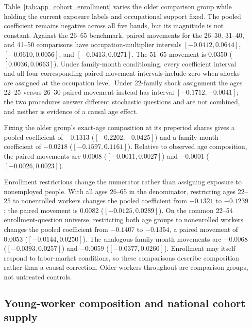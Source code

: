 Table~\ref{tab:app_cohort_enrollment} varies the older comparison group while
holding the current exposure labels and occupational support fixed.  The pooled
coefficient remains negative across all five bands, but its magnitude is not
constant.  Against the 26--65 benchmark, paired movements for the 26--30,
31--40, and 41--50 comparisons have occupation-multiplier intervals
$[-0.0412,0.0644]$, $[-0.0610,0.0056]$, and $[-0.0413,0.0271]$.
The 51--65 movement is 0.0350 ($[0.0036,0.0663]$).  Under family-month
conditioning, every coefficient interval and all four corresponding paired
movement intervals include zero when shocks are assigned at the occupation
level.  Under 22-family shock assignment the ages 22--25 versus 26--30 paired
movement instead has interval $[-0.1712,-0.0041]$; the two procedures answer
different stochastic questions and are not combined, and neither is evidence
of a causal age effect.

Fixing the older group's exact-age composition at its preperiod shares gives a
pooled coefficient of $-0.1313$ ($[-0.2202,-0.0425]$) and a family-month
coefficient of $-0.0218$ ($[-0.1597,0.1161]$).  Relative to observed age
composition, the paired movements are 0.0008 ($[-0.0011,0.0027]$) and
$-0.0001$ ($[-0.0026,0.0023]$).

Enrollment restrictions change the numerator rather than assigning exposure to
nonemployed people.  With all ages 26--65 in the denominator, restricting ages
22--25 to nonenrolled workers changes the pooled coefficient from $-0.1321$ to
$-0.1239$; the paired movement is 0.0082 ($[-0.0125,0.0289]$).  On the common
22--54 enrollment-question universe, restricting both age groups to nonenrolled
workers changes the pooled coefficient from $-0.1407$ to $-0.1354$, a paired
movement of 0.0053 ($[-0.0144,0.0250]$).  The analogous family-month movements
are $-0.0068$ ($[-0.0393,0.0257]$) and $-0.0059$
($[-0.0377,0.0260]$).  Enrollment may itself respond to labor-market conditions,
so these comparisons describe composition rather than a causal correction.
Older workers throughout are comparison groups, not untreated controls.



\subsection{Young-worker composition and national cohort supply}

